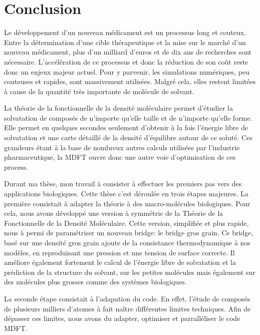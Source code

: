 \chapter{Conclusion}
\label{chap:conclusion}
Le développement d'un nouveau médicament est un processus long et couteux. Entre la détermination d'une cible thérapeutique et la mise sur le marché d'un nouveau médicament, plus d'un milliard d'euros et de dix ans de recherches sont nécessaire.
L'accélération de ce processus et donc la réduction de son coût reste donc un enjeux majeur actuel. Pour y parvenir, les simulations numériques, peu couteuses et rapides, sont massivement utilisées. Malgré cela, elles restent limitées à cause de la quantité très importante de molécule de solvant.


La théorie de la fonctionnelle de la densité moléculaire permet d'étudier la solvatation de composés de n'importe qu'elle taille et de n'importe qu'elle forme. Elle permet en quelques secondes seulement d'obtenir à la fois l'énergie libre de solvatation et une carte détaillé de la densité d'équilibre autour de ce soluté.
Ces grandeurs étant à la base de nombreux autres calculs utilisées par l'industrie pharmaceutique, la MDFT ouvre donc une autre voie d'optimisation de ces process.


Durant ma thèse, mon travail à consister à effectuer les premiers pas vers des applications biologiques. Cette thèse c'est déroulée en trois étapes majeures. La première consistait à adapter la théorie à des macro-molécules biologiques. Pour cela, nous avons développé une version à symmétrie de la Théorie de la Fonctionnelle de la Densité Moléculaire. Cette version, simplifiée et plus rapide, nous à permi de paramétriser un nouveau bridge: le bridge gros grain.
Ce bridge, basé sur une densité gros grain ajoute de la consistance thermodynamique à nos modèles, en reproduisant une pression et une tension de surface correcte. Il améliore également fortement le calcul de l’énergie libre de solvatation et la prédiction de la structure du solvant, sur les petites molécules mais également sur des molécules plus grosses comme des systèmes biologiques.


La seconde étape consistait à l'adapation du code. En effet, l'étude de composés de plusieurs milliers d'atomes à fait naître différentes limites techniques. Afin de dépasser ces limites, nous avons du adapter, optimiser et parralléliser le code MDFT.


